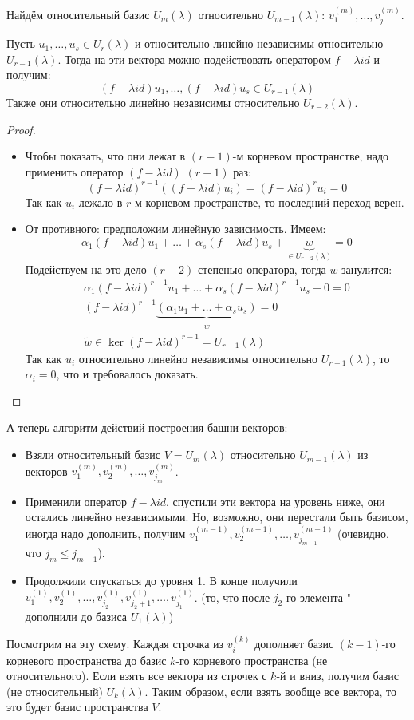 Найдём относительный базис $U_m(\lambda)$ относительно $U_{m-1}(\lambda)$: $v_1^{(m)}, \dots, v_j^{(m)}$.
\begin{lemma}
	Пусть $u_1, \dots, u_s \in U_r(\lambda)$ и относительно линейно независимы относительно $U_{r-1}(\lambda)$.
	Тогда на эти вектора можно подействовать оператором $f-\lambda id$ и получим:
	\[ (f-\lambda id)u_1, \dots, (f-\lambda id)u_s \in U_{r-1}(\lambda)\]
	Также они относительно линейно независимы относительно $U_{r-2}(\lambda)$.
\end{lemma}
\begin{proof}
	\begin{itemize}
	\item
		Чтобы показать, что они лежат в $(r-1)$-м корневом пространстве, надо применить оператор $(f-\lambda id)$ $(r-1)$ раз:
		\[ (f - \lambda id)^{r-1} ((f-\lambda id) u_i) = (f - \lambda id)^r u_i = 0 \]
		Так как $u_i$ лежало в $r$-м корневом пространстве, то последний переход верен.
	\item
		От противного: предположим линейную зависимость.
		Имеем:
		\[ \alpha_1(f-\lambda id) u_1 + \dots + \alpha_s (f-\lambda id) u_s + \underbrace{w}_{\in U_{r-2}(\lambda)} = 0\]
		Подействуем на это дело $(r-2)$ степенью оператора, тогда $w$ занулится:
		\begin{gather*}
			\alpha_1(f-\lambda id)^{r-1} u_1 + \dots + \alpha_s (f-\lambda id)^{r-1} u_s + 0 = 0 \\
			(f-\lambda id)^{r-1}\underbrace{(\alpha_1 u_1 + \dots + \alpha_s u_s )}_{\widetilde w} = 0 \\
			\widetilde w \in \ker (f - \lambda id)^{r-1} = U_{r-1}(\lambda)
		\end{gather*}
		Так как $u_i$ относительно линейно независимы относительно $U_{r - 1}(\lambda)$, то $\alpha_i=0$,
		что и требовалось доказать.
	\end{itemize}
\end{proof}

А теперь алгоритм действий построения башни векторов:
\begin{itemize}
\item
	Взяли относительный базис $V=U_m(\lambda)$ относительно $U_{m-1}(\lambda)$ из векторов
	$v_1^{(m)}, v_2^{(m)}, \dots, v_{j_m}^{(m)}$.
\item
	Применили оператор $f - \lambda id$, спустили эти вектора на уровень ниже, они остались линейно независимыми.
	Но, возможно, они перестали быть базисом, иногда надо дополнить, получим
	$v_1^{(m-1)}, v_2^{(m-1)}, \dots, v_{j_{m-1}}^{(m-1)}$
	(очевидно, что $j_m \le j_{m-1}$).
\item
	Продолжили спускаться до уровня 1.
	В конце получили $v_1^{(1)}, v_2^{(1)}, \dots, v_{j_{2}}^{(1)}, v_{j_{2}+1}^{(1)}, \dots, v_{j_{1}}^{(1)}$.
	(то, что после $j_2$-го элемента "--- дополнили до базиса $U_1(\lambda)$)
\end{itemize}
Посмотрим на эту схему.
Каждая строчка из $v_i^{(k)}$ дополняет базис $(k-1)$-го корневого пространства до базис $k$-го
корневого пространства (не относительного).
Если взять все вектора из строчек с $k$-й и вниз, получим базис (не относительный) $U_k(\lambda)$.
Таким образом, если взять вообще все вектора, то это будет базис пространства $V$.

